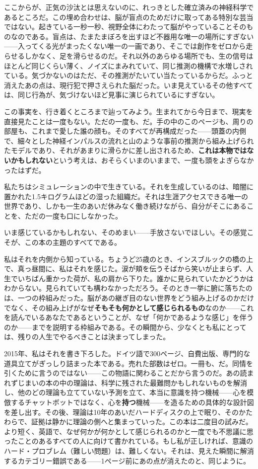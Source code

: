 \documentclass[11pt, twoside, openright]{book}
\begin{document}
ここからが、正気の沙汰とは思えないのに、れっきとした確立済みの神経科学であるところだ。この埋め合わせは、脳が盲点のためだけに取ってある特別な芸当ではない。起きている一秒一秒、視野全体にわたって脳がやっていることそのものなのである。盲点は、たまたまぼろを出すほど不器用な唯一の場所にすぎない------入ってくる光がまったくない唯一の一画であり、そこでは創作をゼロから走らせるしかなく、足を滑らせるのだ。それ以外のあらゆる場所でも、生の信号はほとんど同じくらい薄く、ノイズにまみれていて、同じ推測の機構で水増しされている。気づかないのはただ、その推測がたいてい当たっているからだ。ふっと消えたあの点は、現行犯で押さえられた脳だった。いま見えているその他すべては、同じ行為が、気づけないほど見事に演じられているにすぎない。

この事実を、行き着くところまで辿ってみよう。生まれてから今日まで、現実を直接見たことは一度もない。ただの一度も、だ。手の中のこのページも、周りの部屋も、これまで愛した誰の顔も。そのすべてが再構成だった------頭蓋の内側で、細々とした神経インパルスの流れと山のような事前の推測から組み上げられたモデルであり、それがあまりに滑らかに差し出されるため、\textbf{これは本物ではないかもしれない}という考えは、おそらくいまのいままで、一度も頭をよぎらなかったはずだ。

私たちはシミュレーションの中で生きている。それを生成しているのは、暗闇に置かれた1.5キログラムほどの湿った組織だ。それは生涯アクセスできる唯一の世界であり、しかも一生のあいだ休みなく働き続けながら、自分がそこにあることを、ただの一度も口にしなかった。

いま感じているかもしれない、そのめまい------手放さないでほしい。その感覚こそが、この本の主題のすべてである。

私はそれを内側から知っている。ちょうど25歳のとき、インスブルックの橋の上で、真っ昼間に、私はそれを感じた。涙が頬を伝うそばから笑いが止まらず、人生でいちばん重かった荷が、私の肩から下りた。誰かに見られていたかどうかはわからない。見られていても構わなかっただろう。そのとき一挙に腑に落ちたのは、一つの枠組みだった。脳があの継ぎ目のない世界をどう組み上げるのかだけでなく、その組み上げがなぜ\textbf{そもそも何かとして感じられるもの}なのか------これを読んでいるあなたであるということが、なぜ「何かであるような感じ」を伴うのか------までを説明する枠組みである。その瞬間から、少なくとも私にとっては、残りの人生でやるべきことは決まってしまった。

2015年、私はそれを書き下ろした。ドイツ語で300ページ、自費出版、専門的な道具立てがぎっしり詰まった本である。売れた部数はゼロ。一冊も、だ。同情を引くために言うのではない------この物語に関わることだから言うのだ。あの読まれずじまいの本の中の理論は、科学に残された最難問かもしれないものを解消し、他のどの理論も立てていない予測を立て、本当に意識を持つ機械------心を模倣するチャットボットではなく、心を\textbf{持つ}機械------を造るための具体的な設計図を差し出す。その後、理論は10年のあいだハードディスクの上で眠り、そのかたわらで、証拠は静かに理論の側へと集まっていった。この本は二度目の試みだ。より短く、英語で、なぜ何かが何かとして感じられるのかと一度でも不思議に思ったことのあるすべての人に向けて書かれている。もし私が正しければ、意識のハード・プロブレム（難しい問題）は、難しくない。それは、見えた瞬間に解消するカテゴリー錯誤である------1ページ前にあの点が消えたのと、同じように。
\end{document}
